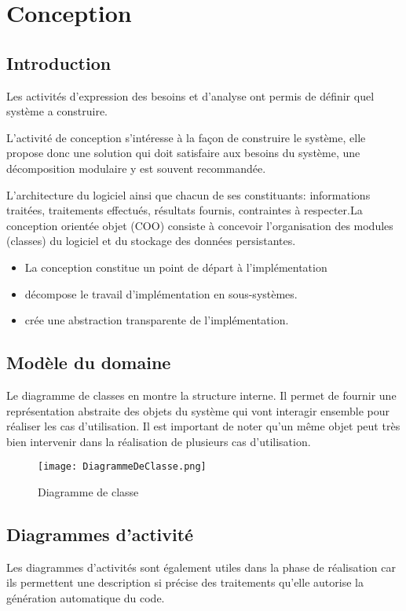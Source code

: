 \chapter{Conception}


\section{Introduction}
Les activités d'expression des besoins et d'analyse ont permis de définir quel système a construire.

L’activité de conception s’intéresse à la façon de construire le système, elle propose donc une solution qui doit satisfaire aux besoins du système, une décomposition modulaire y est souvent recommandée.

L’architecture du logiciel ainsi que chacun de ses constituants: informations traitées, traitements effectués, résultats fournis, contraintes à respecter.La conception orientée objet (COO) consiste à concevoir l’organisation des modules (classes) du logiciel et du stockage des données persistantes.

\begin{itemize}
	\item La conception constitue un point de départ à l’implémentation 
	\item décompose le travail d’implémentation en sous-systèmes.
	\item crée une abstraction transparente de l’implémentation. 
\end{itemize}

\section{Modèle du domaine}
Le diagramme de classes en montre la structure interne. Il permet de fournir une représentation abstraite des objets du système qui vont interagir ensemble pour réaliser les cas d’utilisation. Il est important de noter qu’un même objet peut très bien intervenir dans la réalisation de plusieurs cas d’utilisation.

\begin{figure}[H]
	\centering
	\texttt{[image: DiagrammeDeClasse.png]}
	\caption{Diagramme de classe}
	\label{fig:diagramme class}
\end{figure}

\section{Diagrammes d’activité}
Les diagrammes d’activités sont également utiles dans la phase de réalisation car ils permettent une description si précise des traitements qu’elle autorise la génération automatique du code.

